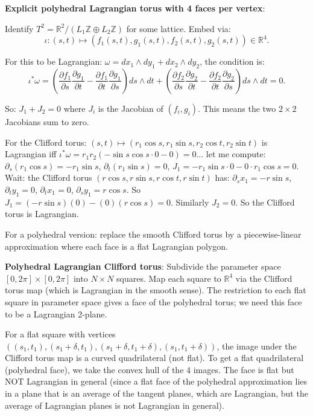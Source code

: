 \documentclass[12pt]{article}
\theoremstyle{definition}
\begin{document}
\textbf{Explicit polyhedral Lagrangian torus with 4 faces per vertex}:

Identify $T^2 = \mathbb{R}^2/(L_1\mathbb{Z}\oplus L_2\mathbb{Z})$ for some lattice. Embed via:
$$\iota: (s,t)\mapsto(f_1(s,t), g_1(s,t), f_2(s,t), g_2(s,t))\in\mathbb{R}^4.$$

For this to be Lagrangian: $\omega = dx_1\wedge dy_1+dx_2\wedge dy_2$, the condition is:
$$\iota^*\omega = \left(\frac{\partial f_1}{\partial s}\frac{\partial g_1}{\partial t} - \frac{\partial f_1}{\partial t}\frac{\partial g_1}{\partial s}\right)ds\wedge dt + \left(\frac{\partial f_2}{\partial s}\frac{\partial g_2}{\partial t} - \frac{\partial f_2}{\partial t}\frac{\partial g_2}{\partial s}\right)ds\wedge dt = 0.$$

So: $J_1 + J_2 = 0$ where $J_i$ is the Jacobian of $(f_i,g_i)$. This means the two $2\times 2$ Jacobians sum to zero.

For the Clifford torus: $(s,t)\mapsto(r_1\cos s, r_1\sin s, r_2\cos t, r_2\sin t)$ is Lagrangian iff $\iota^*\omega = r_1r_2(-\sin s\cos s\cdot 0 - 0) = 0$... let me compute: $\partial_{s}(r_1\cos s) = -r_1\sin s$, $\partial_t(r_1\sin s) = 0$, $J_1 = -r_1\sin s\cdot 0 - 0\cdot r_1\cos s = 0$. Wait: the Clifford torus $(r\cos s, r\sin s, r\cos t, r\sin t)$ has:
$\partial_s x_1 = -r\sin s$, $\partial_t y_1 = 0$, $\partial_t x_1 = 0$, $\partial_s y_1 = r\cos s$. So $J_1 = (-r\sin s)(0) - (0)(r\cos s) = 0$. Similarly $J_2 = 0$. So the Clifford torus is Lagrangian.

For a polyhedral version: replace the smooth Clifford torus by a piecewise-linear approximation where each face is a flat Lagrangian polygon.

\textbf{Polyhedral Lagrangian Clifford torus}: Subdivide the parameter space $[0,2\pi]\times[0,2\pi]$ into $N\times N$ squares. Map each square to $\mathbb{R}^4$ via the Clifford torus map (which is Lagrangian in the smooth sense). The restriction to each flat square in parameter space gives a face of the polyhedral torus; we need this face to be a Lagrangian 2-plane.

For a flat square with vertices $((s_1,t_1),(s_1+\delta,t_1),(s_1+\delta,t_1+\delta),(s_1,t_1+\delta))$, the image under the Clifford torus map is a curved quadrilateral (not flat). To get a flat quadrilateral (polyhedral face), we take the convex hull of the 4 images. The face is flat but NOT Lagrangian in general (since a flat face of the polyhedral approximation lies in a plane that is an average of the tangent planes, which are Lagrangian, but the average of Lagrangian planes is not Lagrangian in general).
\end{document}
